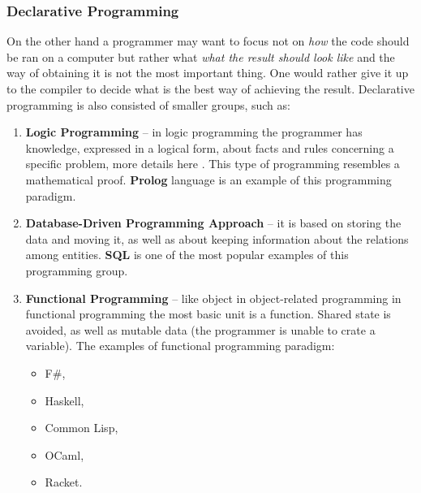     \subsubsection{Declarative Programming}
        On the other hand a programmer may want to focus not on \textit{how} the code should be ran on a computer but rather what \textit{what the result should look like} and the way of obtaining it is not the most important thing. One would rather give it up to the compiler to decide what is the best way of achieving the result. Declarative programming is also consisted of smaller groups, such as:
        \begin{enumerate} 
            \item \textbf{Logic Programming} -- in logic programming the programmer has knowledge, expressed in a logical form, about facts and rules concerning a specific problem, more details here \cite{logicProgramming}. This type of programming resembles a mathematical proof. \textbf{Prolog} language is an example of this programming paradigm.
            
            \item \textbf{Database-Driven Programming Approach} -- it is based on storing the data and moving it, as well as about keeping information about the relations among entities. \textbf{SQL} is one of the most popular examples of this programming group.
            
            \item \textbf{Functional Programming} -- like object in object-related programming in functional programming the most basic unit is a function. Shared state is avoided, as well as mutable data (the programmer is unable to crate a variable). The examples of functional programming paradigm:
                \begin{itemize}
                    \item F\#,
                    \item Haskell,
                    \item Common Lisp,
                    \item OCaml,
                    \item Racket.
                \end{itemize}
        \end{enumerate}
    
